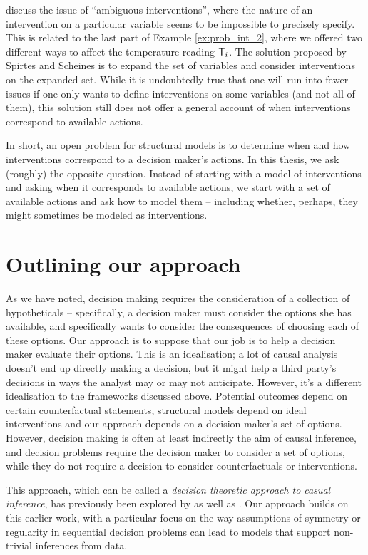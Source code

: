 \citet{spirtesCausalInferenceAmbiguous2004} discuss the issue of ``ambiguous interventions'', where the nature of an intervention on a particular variable seems to be impossible to precisely specify. This is related to the last part of Example \ref{ex:prob_int_2}, where we offered two different ways to affect the temperature reading $\mathsf{T}_i$. The solution proposed by Spirtes and Scheines is to expand the set of variables and consider interventions on the expanded set. While it is undoubtedly true that one will run into fewer issues if one only wants to define interventions on some variables (and not all of them), this solution still does not offer a general account of when interventions correspond to available actions.

In short, an open problem for structural models is to determine when and how interventions correspond to a decision maker's actions. In this thesis, we ask (roughly) the opposite question. Instead of starting with a model of interventions and asking when it corresponds to available actions, we start with a set of available actions and ask how to model them -- including whether, perhaps, they might sometimes be modeled as interventions.

\section{Outlining our approach}

As we have noted, decision making requires the consideration of a collection of hypotheticals -- specifically, a decision maker must consider the options she has available, and specifically wants to consider the consequences of choosing each of these options. Our approach is to suppose that our job is to help a decision maker evaluate their options. This is an idealisation; a lot of causal analysis doesn't end up directly making a decision, but it might help a third party's decisions in ways the analyst may or may not anticipate. However, it's a different idealisation to the frameworks discussed above. Potential outcomes depend on certain counterfactual statements, structural models depend on ideal interventions and our approach depends on a decision maker's set of options. However, decision making is often at least indirectly the aim of causal inference, and decision problems require the decision maker to consider a set of options, while they do not require a decision to consider counterfactuals or interventions. 

This approach, which can be called a \emph{decision theoretic approach to casual inference}, has previously been explored by \citet{heckerman_decision-theoretic_1995} as well as \citet{dawid_causal_2000,dawid_influence_2002,dawid_decision-theoretic_2012,dawid_decision-theoretic_2020}. Our approach builds on this earlier work, with a particular focus on the way assumptions of symmetry or regularity in sequential decision problems can lead to models that support non-trivial inferences from data.

